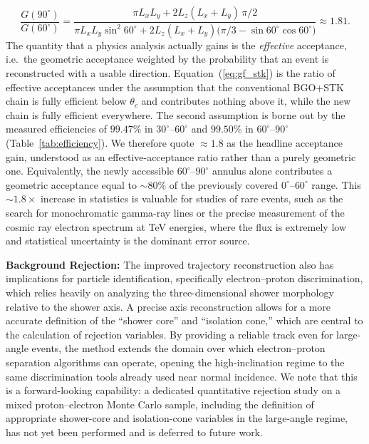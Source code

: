 \documentclass[preprint,12pt]{elsarticle}
\begin{document}
\begin{equation}
\frac{G(90^{\circ})}{G(60^{\circ})}
=\frac{\pi L_xL_y+2L_z(L_x+L_y)\,\pi/2}
{\pi L_xL_y\sin^{2}60^{\circ}+2L_z(L_x+L_y)\bigl(\pi/3-\sin60^{\circ}\cos60^{\circ}\bigr)}
\approx 1.81.
\label{eq:gf_stk}
\end{equation}
The quantity that a physics analysis actually gains is the \emph{effective} acceptance, i.e.\ the geometric acceptance weighted by the probability that an event is reconstructed with a usable direction. Equation~(\ref{eq:gf_stk}) is the ratio of effective acceptances under the assumption that the conventional BGO+STK chain is fully efficient below $\theta_{c}$ and contributes nothing above it, while the new chain is fully efficient everywhere. The second assumption is borne out by the measured efficiencies of $99.47\%$ in $30^{\circ}$--$60^{\circ}$ and $99.50\%$ in $60^{\circ}$--$90^{\circ}$ (Table~\ref{tab:efficiency}). We therefore quote $\approx 1.8$ as the headline acceptance gain, understood as an effective-acceptance ratio rather than a purely geometric one. Equivalently, the newly accessible $60^{\circ}$--$90^{\circ}$ annulus alone contributes a geometric acceptance equal to $\sim 80\%$ of the previously covered $0^{\circ}$--$60^{\circ}$ range. This $\sim 1.8\times$ increase in statistics is valuable for studies of rare events, such as the search for monochromatic gamma-ray lines or the precise measurement of the cosmic ray electron spectrum at TeV energies, where the flux is extremely low and statistical uncertainty is the dominant error source.

\textbf{Background Rejection:} The improved trajectory reconstruction also has implications for particle identification, specifically electron--proton discrimination, which relies heavily on analyzing the three-dimensional shower morphology relative to the shower axis. A precise axis reconstruction allows for a more accurate definition of the ``shower core'' and ``isolation cone,'' which are central to the calculation of rejection variables. By providing a reliable track even for large-angle events, the method extends the domain over which electron--proton separation algorithms can operate, opening the high-inclination regime to the same discrimination tools already used near normal incidence. We note that this is a forward-looking capability: a dedicated quantitative rejection study on a mixed proton--electron Monte Carlo sample, including the definition of appropriate shower-core and isolation-cone variables in the large-angle regime, has not yet been performed and is deferred to future work.
\end{document}
